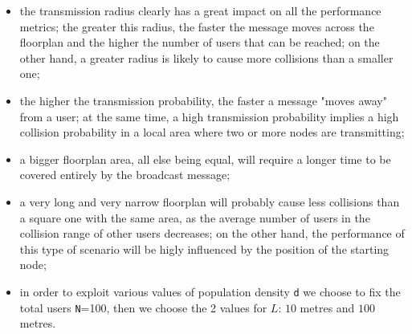 \begin{itemize}
    \item the transmission radius clearly has a great impact on all the
    performance metrics; the greater this radius, the faster the message moves
    across the floorplan and the higher the number of users that can be reached;
    on the other hand, a greater radius is likely to cause more collisions than
    a smaller one;
    \item the higher the transmission probability, the faster a message "moves
    away" from a user; at the same time, a high transmission probability implies
    a high collision probability in a local area where two or more nodes are
    transmitting;
    \item a bigger floorplan area, all else being equal, will require a longer
    time to be covered entirely by the broadcast message;
    \item a very long and very narrow floorplan will probably cause less
    collisions than a square one with the same area, as the average number of
    users in the collision range of other users decreases; on the other hand,
    the performance of this type of scenario will be higly influenced by the
    position of the starting node;
    \item in order to exploit various values of  population density \texttt{d}
	we choose to fix the total users \texttt{N}=100, then we choose the 2 values
	for $L$: $10$ metres and $100$ metres.
\end{itemize}


